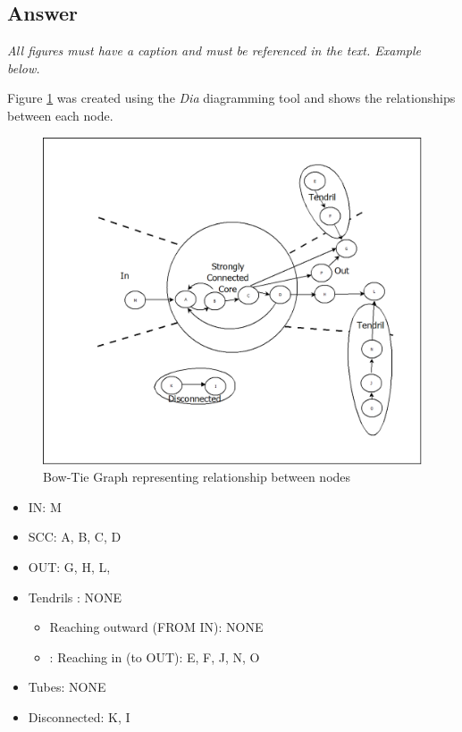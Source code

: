 \documentclass[12pt]{article}
\begin{document}
\subsection*{Answer}

\emph{All figures must have a caption and must be referenced in the text. Example below.}

Figure \ref{fig:bowTieGraph} was created using the \textit{Dia} diagramming tool \cite{dia} and shows the relationships between each node.

\begin{figure}[h]
    \centering
    \includegraphics[trim=10 10 10 50, clip, width=\textwidth] {Q1/Q1.png}
    \caption{Bow-Tie Graph representing relationship between nodes}
    \label{fig:bowTieGraph}
\end{figure}

\begin{itemize}
  \item IN: M
  \item SCC: A, B, C, D
  \item OUT: G, H, L,
  \item Tendrils : NONE
	\begin{itemize}
		\item Reaching outward (FROM IN): NONE
		\item: Reaching in (to OUT): E, F, J, N, O
	\end{itemize}
\item Tubes: NONE
\item Disconnected: K, I
\end{itemize}
\end{document}
